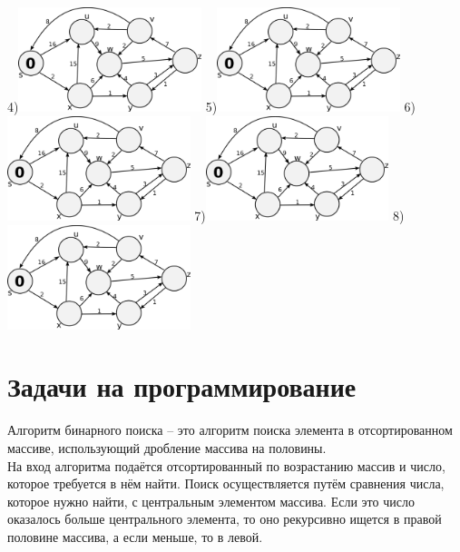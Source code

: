 \documentclass[10pt]{exam}
\begin{document}
\begin{questions}
{\begin{multicols}{2}
4)\includegraphics[width=0.4\textwidth]{images/graph_empty.png} \hfill
\vfill
5)\includegraphics[width=0.4\textwidth]{images/graph_empty.png} \hfill
6)\includegraphics[width=0.4\textwidth]{images/graph_empty.png} \hfill
7)\includegraphics[width=0.4\textwidth]{images/graph_empty.png} \hfill
8)\includegraphics[width=0.4\textwidth]{images/graph_empty.png} \hfill
\end{multicols} 
}




\section{Задачи на программирование}
\vbox{
\question[80] Алгоритм бинарного поиска -- это алгоритм поиска элемента в отсортированном массиве, использующий дробление массива на половины.\\
На вход алгоритма подаётся отсортированный по возрастанию массив и число, которое требуется в нём найти. Поиск осуществляется путём сравнения числа, которое нужно найти, с центральным элементом массива. Если это число оказалось больше центрального элемента, то оно рекурсивно ищется в правой половине массива, а если меньше, то в левой.
\addpoints
}


\end{questions}
\end{document}
